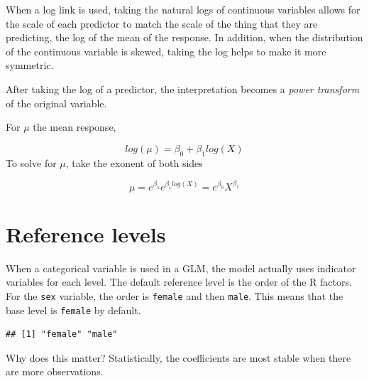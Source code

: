 \documentclass[openany]{book}
\newenvironment{Shaded}{\begin{snugshade}}{\end{snugshade}}
\newcommand{\KeywordTok}[1]{\textcolor[rgb]{0.13,0.29,0.53}{\textbf{#1}}}
\newcommand{\NormalTok}[1]{#1}
\newcommand{\OperatorTok}[1]{\textcolor[rgb]{0.81,0.36,0.00}{\textbf{#1}}}
\newcommand{\StringTok}[1]{\textcolor[rgb]{0.31,0.60,0.02}{#1}}
\begin{document}
When a log link is used, taking the natural logs of continuous variables allows for the scale of each predictor to match the scale of the thing that they are predicting, the log of the mean of the response. In addition, when the distribution of the continuous variable is skewed, taking the log helps to make it more symmetric.

After taking the log of a predictor, the interpretation becomes a \emph{power transform} of the original variable.

For \(\mu\) the mean response,

\[log(\mu) = \beta_0 + \beta_1 log(X)\]
To solve for \(\mu\), take the exonent of both sides

\[\mu = e^{\beta_1} e^{\beta_1 log(X)} = e^{\beta_0} X^{\beta_1}\]

\hypertarget{reference-levels}{%
\section{Reference levels}\label{reference-levels}}

When a categorical variable is used in a GLM, the model actually uses indicator variables for each level. The default reference level is the order of the R factors. For the \texttt{sex} variable, the order is \texttt{female} and then \texttt{male}. This means that the base level is \texttt{female} by default.

\begin{Shaded}
\end{Shaded}

\begin{verbatim}
## [1] "female" "male"
\end{verbatim}

Why does this matter? Statistically, the coefficients are most stable when there are more observations.

\begin{Shaded}
\end{Shaded}
\end{document}
